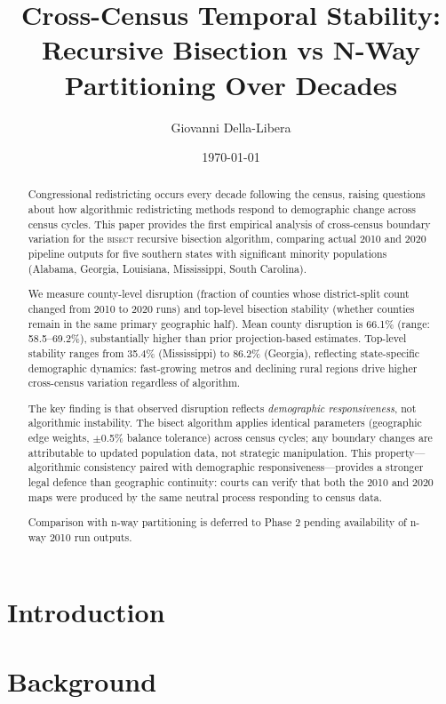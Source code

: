 \documentclass[12pt]{article}
\title{Cross-Census Temporal Stability:\\
Recursive Bisection vs N-Way Partitioning Over Decades}
\author{Giovanni Della-Libera}
\date{\today}
\begin{document}
\maketitle

\begin{abstract}
Congressional redistricting occurs every decade following the census, raising questions about how algorithmic redistricting methods respond to demographic change across census cycles. This paper provides the first empirical analysis of cross-census boundary variation for the \textsc{bisect} recursive bisection algorithm, comparing actual 2010 and 2020 pipeline outputs for five southern states with significant minority populations (Alabama, Georgia, Louisiana, Mississippi, South Carolina).

We measure county-level disruption (fraction of counties whose district-split count changed from 2010 to 2020 runs) and top-level bisection stability (whether counties remain in the same primary geographic half). Mean county disruption is 66.1\% (range: 58.5--69.2\%), substantially higher than prior projection-based estimates. Top-level stability ranges from 35.4\% (Mississippi) to 86.2\% (Georgia), reflecting state-specific demographic dynamics: fast-growing metros and declining rural regions drive higher cross-census variation regardless of algorithm.

The key finding is that observed disruption reflects \emph{demographic responsiveness}, not algorithmic instability. The bisect algorithm applies identical parameters (geographic edge weights, $\pm$0.5\% balance tolerance) across census cycles; any boundary changes are attributable to updated population data, not strategic manipulation. This property---algorithmic consistency paired with demographic responsiveness---provides a stronger legal defence than geographic continuity: courts can verify that both the 2010 and 2020 maps were produced by the same neutral process responding to census data.

Comparison with n-way partitioning is deferred to Phase 2 pending availability of n-way 2010 run outputs.
\end{abstract}

\section{Introduction}


\section{Background}

\end{document}
